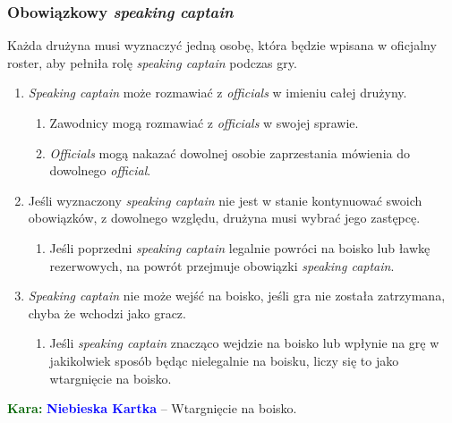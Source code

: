 \documentclass[11pt,a4paper]{article}
\newcommand\bluecard[1]{\bgroup\textcolor{darkgreen}{\textbf{Kara: }}\bgroup\textcolor{blue}{\textbf{Niebieska Kartka}} -- #1}
\begin{document}
\subsubsection{Obowiązkowy \emph{speaking captain}}
Każda drużyna musi wyznaczyć jedną osobę, która będzie
wpisana w oficjalny roster, aby pełniła rolę
\emph{speaking captain} podczas gry.

\begin{enumerate}
  \item \emph{Speaking captain} może rozmawiać z
  \emph{officials} w imieniu całej drużyny.
  \begin{enumerate}
    \item Zawodnicy mogą rozmawiać z \emph{officials} w
    swojej sprawie.
    \item \emph{Officials} mogą nakazać dowolnej osobie
    zaprzestania mówienia do dowolnego \emph{official}.
  \end{enumerate}

  \item Jeśli wyznaczony \emph{speaking captain} nie jest w
  stanie kontynuować swoich obowiązków, z dowolnego względu,
  drużyna musi wybrać jego zastępcę.
  \begin{enumerate}
    \item Jeśli poprzedni \emph{speaking captain} legalnie
    powróci na boisko lub ławkę rezerwowych, na powrót
    przejmuje obowiązki \emph{speaking captain}.
  \end{enumerate}

  \item \emph{Speaking captain} nie może wejść na boisko,
  jeśli gra nie została zatrzymana, chyba że wchodzi jako 
  gracz.
  \begin{enumerate}
    \item Jeśli \emph{speaking captain} znacząco wejdzie na
    boisko lub wpłynie na grę w jakikolwiek sposób będąc
    nielegalnie na boisku, liczy się to jako wtargnięcie na
    boisko.
  \end{enumerate}
\end{enumerate}

\bluecard{Wtargnięcie na boisko.}
\end{document}
